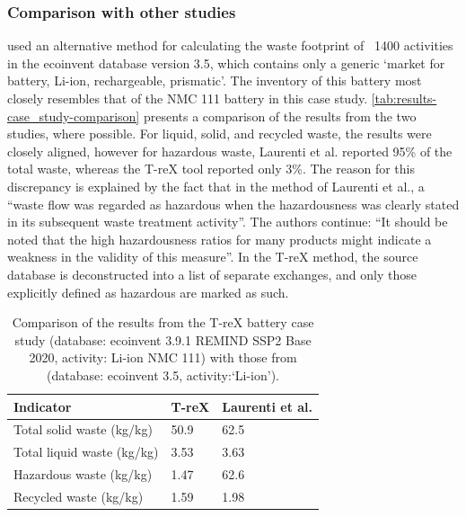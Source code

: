 \subsubsection{Comparison with other studies}\label{sec:results-case_study-comparison}

\cite{laurenti2023wastefootprint} used an alternative method for calculating the waste footprint of ~1400 activities in the ecoinvent database version 3.5, which contains only a generic `market for battery, Li-ion, rechargeable, prismatic'. The inventory of this battery most closely resembles that of the NMC 111 battery in this case study. \autoref{tab:results-case_study-comparison} presents a comparison of the results from the two studies, where possible. For liquid, solid, and recycled waste, the results were closely aligned, however for hazardous waste, Laurenti et al. reported 95\% of the total waste, whereas the T-reX tool reported only 3\%. The reason for this discrepancy is explained by the fact that in the method of Laurenti et al., a ``waste flow was regarded as hazardous when the hazardousness
was clearly stated in its subsequent waste treatment activity''. The authors continue: ``It should be noted that the high hazardousness ratios for many products might indicate a weakness in the validity of this measure''. In the T-reX method, the source database is deconstructed into a list of separate exchanges, and only those explicitly defined as hazardous are marked as such.

\begin{table}[H]
\centering
\caption{Comparison of the results from the T-reX battery case study (database: ecoinvent 3.9.1 REMIND SSP2 Base 2020, activity: Li-ion NMC 111) with those from \cite{laurenti2023wastefootprint} (database: ecoinvent 3.5, activity:`Li-ion').}
\label{tab:results-case_study-comparison}
\begin{tabular}{lll}
\toprule
\textbf{Indicator} & \textbf{T-reX} & \textbf{Laurenti et al.} \\
\midrule
Total solid waste (kg/kg)& 50.9 & 62.5 \\
Total liquid waste (kg/kg) & 3.53 & 3.63 \\
Hazardous waste (kg/kg) & 1.47 & 62.6 \\
Recycled waste (kg/kg) & 1.59 & 1.98 \\
\bottomrule
\end{tabular}
\end{table}

